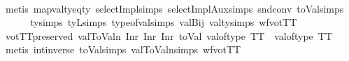 \begin{isabellebody}
\ \ \isamarkupfalse%
\ {\isacharparenleft}{\kern0pt}metis\ mapval{\isacharunderscore}{\kern0pt}ty{\isacharunderscore}{\kern0pt}eq{\isacharunderscore}{\kern0pt}ty{}{}{}\ selectImpl{\isachardot}{\kern0pt}simps\ selectImplAux{\isachardot}{\kern0pt}simps{\isacharparenleft}{\kern0pt}{}{}{\isacharparenright}{\kern0pt}\ snd{\isacharunderscore}{\kern0pt}conv\ toVal{}{}{}{}{\isachardot}{\kern0pt}simps{\isacharparenleft}{\kern0pt}{}{\isacharcomma}{\kern0pt}{}{\isacharparenright}{\kern0pt}\isanewline
\ \ \ \ \ \ ty{}{}{}{\isachardot}{\kern0pt}simps{\isacharparenleft}{\kern0pt}{}{\isacharparenright}{\kern0pt}\ tyL{\isachardot}{\kern0pt}simps\ type{\isacharunderscore}{\kern0pt}of{\isacharunderscore}{\kern0pt}val{\isachardot}{\kern0pt}simps{\isacharparenleft}{\kern0pt}{}{\isacharparenright}{\kern0pt}\ valBij{}\ val{\isacharunderscore}{\kern0pt}ty{\isachardot}{\kern0pt}simps{\isacharparenleft}{\kern0pt}{}{\isacharparenright}{\kern0pt}\ wfvotTT{\isacharparenright}{\kern0pt}\isanewline
\ \ \isamarkupfalse%
%
\endisatagproof
{\isafoldproof}%
%
\isadelimproof
\isanewline
%
\endisadelimproof
\isanewline
\isanewline
{}\isamarkupfalse%
\ votTTpreserved{\isacharcolon}{\kern0pt}\ {\isachardoublequoteopen}val{}ToValn\ {\isacharparenleft}{\kern0pt}Inr\ {\isacharparenleft}{\kern0pt}Inr\ {\isacharparenleft}{\kern0pt}Inr\ {\isacharparenleft}{\kern0pt}toVal{}\ {\isacharparenleft}{\kern0pt}val{\isacharunderscore}{\kern0pt}of{\isacharunderscore}{\kern0pt}type\ {\isacharparenleft}{\kern0pt}TT{\isacharparenright}{\kern0pt}{\isacharparenright}{\kern0pt}{\isacharparenright}{\kern0pt}{\isacharparenright}{\kern0pt}{\isacharparenright}{\kern0pt}{\isacharparenright}{\kern0pt}\ {\isacharequal}{\kern0pt}\ {\isacharparenleft}{\kern0pt}val{\isacharunderscore}{\kern0pt}of{\isacharunderscore}{\kern0pt}type\ {\isacharparenleft}{\kern0pt}TT{\isacharparenright}{\kern0pt}{\isacharparenright}{\kern0pt}{\isachardoublequoteclose}\isanewline
%
\isadelimproof
\ \ %
\endisadelimproof
%
\isatagproof
{}\isamarkupfalse%
\ {\isacharparenleft}{\kern0pt}metis\ int{\isacharunderscore}{\kern0pt}inverse{\isacharunderscore}{\kern0pt}{}\ toVal{}{\isachardot}{\kern0pt}simps{\isacharparenleft}{\kern0pt}{}{\isacharparenright}{\kern0pt}\ val{}ToValn{\isachardot}{\kern0pt}simps{\isacharparenleft}{\kern0pt}{}{\isacharparenright}{\kern0pt}\ wfvotTT{\isacharparenright}{\kern0pt}%

\end{isabellebody}
